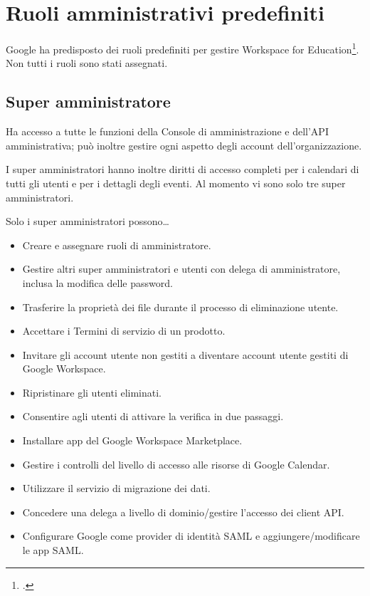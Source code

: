 \chapter{Ruoli amministrativi predefiniti}
Google ha predisposto dei ruoli predefiniti per gestire Workspace for Education\footcite{Google2023b}. Non tutti i ruoli sono stati assegnati.
\section{Super amministratore}
Ha accesso a tutte le funzioni della Console di amministrazione e dell'API amministrativa; può inoltre gestire ogni aspetto degli account dell'organizzazione.

I super amministratori hanno inoltre diritti di accesso completi per i calendari di tutti gli utenti e per i dettagli degli eventi. Al momento vi sono solo tre super amministratori.

Solo i super amministratori possono…
\begin{itemize}
\item Creare e assegnare ruoli di amministratore.
\item Gestire altri super amministratori e utenti con delega di amministratore, inclusa la modifica delle password.
\item Trasferire la proprietà dei file durante il processo di eliminazione utente.
\item Accettare i Termini di servizio di un prodotto.
\item Invitare gli account utente non gestiti a diventare account utente gestiti di Google Workspace.
\item Ripristinare gli utenti eliminati.
\item Consentire agli utenti di attivare la verifica in due passaggi.
\item Installare app del Google Workspace Marketplace.
\item Gestire i controlli del livello di accesso alle risorse di Google Calendar.
\item Utilizzare il servizio di migrazione dei dati.
\item Concedere una delega a livello di dominio/gestire l'accesso dei client API.
\item Configurare Google come provider di identità SAML e aggiungere/modificare le app SAML.
\end{itemize}
